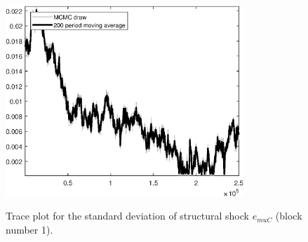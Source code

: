 \begin{figure}[H]
\centering
  \includegraphics[width=0.8\textwidth]{BRS_aggregate/graphs/TracePlot_SE_e_muC_blck_1}\\
    \caption{Trace plot for the standard deviation of structural shock ${e_{muC}}$ (block number 1).}
\end{figure}
